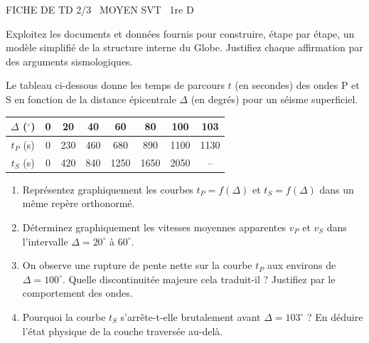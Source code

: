 \documentclass[11pt]{article}
\begin{document}
\begin{tcolorbox}[enhanced,colback=popink,colframe=popink,arc=10pt,boxrule=0pt,left=12pt,right=12pt,top=9pt,bottom=9pt]
{\color{white}\popxbold\small FICHE DE TD 2/3 \textbullet\ MOYEN \hfill SVT \textbullet\ 1re D\par}
\end{tcolorbox}
\vspace{4pt}
\noindent Exploitez les documents et données fournis pour construire, étape par étape, un modèle simplifié de la structure interne du Globe. Justifiez chaque affirmation par des arguments sismologiques.

\begin{exercice}
\noindent Le tableau ci-dessous donne les temps de parcours $t$ (en secondes) des ondes P et S en fonction de la distance épicentrale $\Delta$ (en degrés) pour un séisme superficiel.

\begin{center}
\begin{tabular}{|c|c|c|c|c|c|c|c|}
\hline
$\Delta$ ($^\circ$) & 0 & 20 & 40 & 60 & 80 & 100 & 103 \\
\hline
$t_P$ (s) & 0 & 230 & 460 & 680 & 890 & 1100 & 1130 \\
\hline
$t_S$ (s) & 0 & 420 & 840 & 1250 & 1650 & 2050 & -- \\
\hline
\end{tabular}
\end{center}

\begin{enumerate}
    \item Représentez graphiquement les courbes $t_P = f(\Delta)$ et $t_S = f(\Delta)$ dans un même repère orthonormé. 
    \item Déterminez graphiquement les vitesses moyennes apparentes $v_P$ et $v_S$ dans l'intervalle $\Delta = 20^\circ$ à $60^\circ$. 
    \item On observe une rupture de pente nette sur la courbe $t_P$ aux environs de $\Delta = 100^\circ$. Quelle discontinuitée majeure cela traduit-il ? Justifiez par le comportement des ondes.
    \item Pourquoi la courbe $t_S$ s'arrête-t-elle brutalement avant $\Delta = 103^\circ$ ? En déduire l'état physique de la couche traversée au-delà.
\end{enumerate}
\end{exercice}
\end{document}
